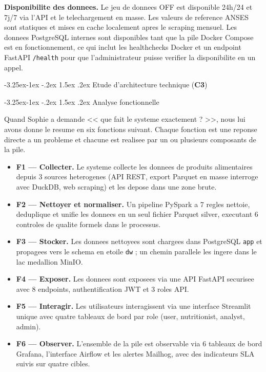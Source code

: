 \documentclass[a4paper,11pt,oneside,openany]{report}
\makeatletter
\renewcommand\subsection{\@startsection{subsection}{2}{\z@}%
  {-3.25ex\@plus -1ex \@minus -.2ex}%
  {1.5ex \@plus .2ex}%
  {\normalfont\large\bfseries\color{ntdarkgreen}}}
\renewcommand\subsubsection{\@startsection{subsubsection}{3}{\z@}%
  {-3.25ex\@plus -1ex \@minus -.2ex}%
  {1.5ex \@plus .2ex}%
  {\normalfont\normalsize\bfseries\color{ntblue}}}
\newcommand{\competence}[1]{\textbf{\textcolor{ntgreen}{#1}}}
\makeatother
\begin{document}
\textbf{Disponibilite des donnees.} Le jeu de donnees OFF est
disponible 24h/24 et 7j/7 via l'API et le telechargement en masse.
Les valeurs de reference ANSES sont statiques et mises en cache
localement apres le scraping mensuel. Les donnees PostgreSQL internes
sont disponibles tant que la pile Docker Compose est en
fonctionnement, ce qui inclut les healthchecks Docker et un endpoint
FastAPI \texttt{/health} pour que l'administrateur puisse verifier la
disponibilite en un appel.

\subsection{Etude d'architecture technique (\competence{C3})}

\subsubsection{Analyse fonctionnelle}

Quand Sophie a demande << que fait le systeme exactement ? >>, nous
lui avons donne le resume en six fonctions suivant. Chaque fonction
est une reponse directe a un probleme et chacune est realisee par un
ou plusieurs composants de la pile.

\begin{itemize}[nosep]
  \item \textbf{F1 --- Collecter.} Le systeme collecte les donnees
        de produits alimentaires depuis 3 sources heterogenes (API
        REST, export Parquet en masse interroge avec DuckDB, web
        scraping) et les depose dans une zone brute.
  \item \textbf{F2 --- Nettoyer et normaliser.} Un pipeline PySpark
        a 7 regles nettoie, deduplique et unifie les donnees en un
        seul fichier Parquet silver, executant 6 controles de
        qualite formels dans le processus.
  \item \textbf{F3 --- Stocker.} Les donnees nettoyees sont chargees
        dans PostgreSQL \texttt{app} et propagees vers le schema en
        etoile \texttt{dw} ; un chemin parallele les ingere dans le
        lac medallion MinIO.
  \item \textbf{F4 --- Exposer.} Les donnees sont exposees via une
        API FastAPI securisee avec 8 endpoints, authentification JWT
        et 3 roles API.
  \item \textbf{F5 --- Interagir.} Les utilisateurs interagissent
        via une interface Streamlit unique avec quatre tableaux de
        bord par role (user, nutritionist, analyst, admin).
  \item \textbf{F6 --- Observer.} L'ensemble de la pile est
        observable via 6 tableaux de bord Grafana, l'interface
        Airflow et les alertes Mailhog, avec des indicateurs SLA
        suivis sur quatre cibles.
\end{itemize}
\end{document}
